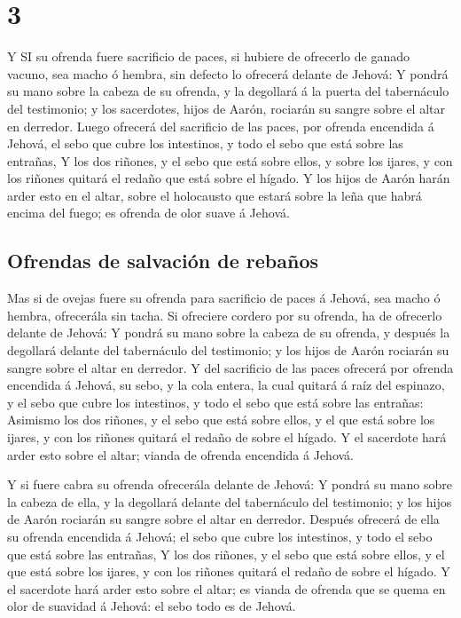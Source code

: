 \hypertarget{section-2}{%
\section{3}\label{section-2}}

 Y SI su ofrenda fuere sacrificio de paces, si hubiere de
ofrecerlo de ganado vacuno, sea macho ó hembra, sin defecto lo ofrecerá
delante de Jehová:  Y pondrá su mano sobre la cabeza de su
ofrenda, y la degollará á la puerta del tabernáculo del testimonio; y
los sacerdotes, hijos de Aarón, rociarán su sangre sobre el altar en
derredor.  Luego ofrecerá del sacrificio de las paces, por
ofrenda encendida á Jehová, el sebo que cubre los intestinos, y todo el
sebo que está sobre las entrañas,  Y los dos riñones, y el
sebo que está sobre ellos, y sobre los ijares, y con los riñones quitará
el redaño que está sobre el hígado.  Y los hijos de Aarón
harán arder esto en el altar, sobre el holocausto que estará sobre la
leña que habrá encima del fuego; es ofrenda de olor suave á Jehová.

\hypertarget{ofrendas-de-salvaciuxf3n-de-rebauxf1os}{%
\subsection{Ofrendas de salvación de
rebaños}\label{ofrendas-de-salvaciuxf3n-de-rebauxf1os}}

 Mas si de ovejas fuere su ofrenda para sacrificio de paces
á Jehová, sea macho ó hembra, ofrecerála sin tacha.  Si
ofreciere cordero por su ofrenda, ha de ofrecerlo delante de Jehová:
 Y pondrá su mano sobre la cabeza de su ofrenda, y después
la degollará delante del tabernáculo del testimonio; y los hijos de
Aarón rociarán su sangre sobre el altar en derredor.  Y del
sacrificio de las paces ofrecerá por ofrenda encendida á Jehová, su
sebo, y la cola entera, la cual quitará á raíz del espinazo, y el sebo
que cubre los intestinos, y todo el sebo que está sobre las entrañas:
 Asimismo los dos riñones, y el sebo que está sobre ellos,
y el que está sobre los ijares, y con los riñones quitará el redaño de
sobre el hígado.  Y el sacerdote hará arder esto sobre el
altar; vianda de ofrenda encendida á Jehová.

 Y si fuere cabra su ofrenda ofrecerála delante de Jehová:
 Y pondrá su mano sobre la cabeza de ella, y la degollará
delante del tabernáculo del testimonio; y los hijos de Aarón rociarán su
sangre sobre el altar en derredor.  Después ofrecerá de
ella su ofrenda encendida á Jehová; el sebo que cubre los intestinos, y
todo el sebo que está sobre las entrañas,  Y los dos
riñones, y el sebo que está sobre ellos, y el que está sobre los ijares,
y con los riñones quitará el redaño de sobre el hígado.  Y
el sacerdote hará arder esto sobre el altar; es vianda de ofrenda que se
quema en olor de suavidad á Jehová: el sebo todo es de Jehová.

